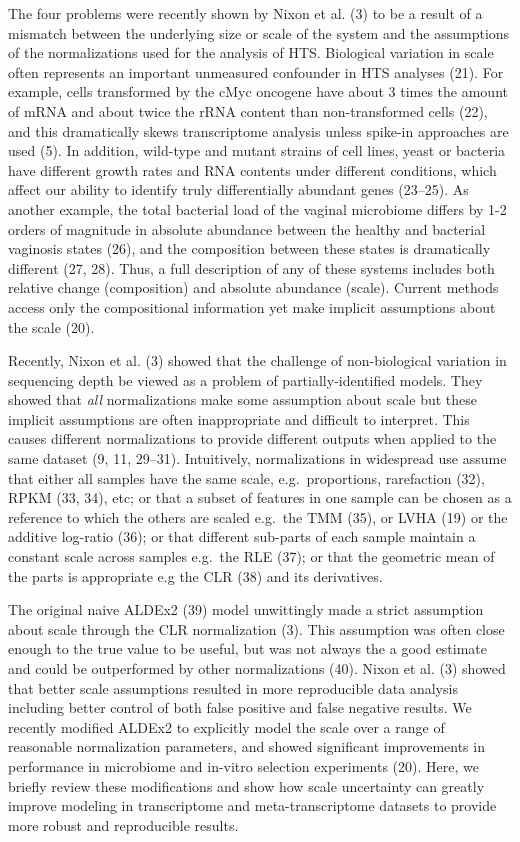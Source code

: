 \documentclass[
]{article}
\begin{document}
The four problems were recently shown by Nixon et al. (3) to be a result
of a mismatch between the underlying size or scale of the system and the
assumptions of the normalizations used for the analysis of HTS.
Biological variation in scale often represents an important unmeasured
confounder in HTS analyses (21). For example, cells transformed by the
cMyc oncogene have about 3 times the amount of mRNA and about twice the
rRNA content than non-transformed cells (22), and this dramatically
skews transcriptome analysis unless spike-in approaches are used (5). In
addition, wild-type and mutant strains of cell lines, yeast or bacteria
have different growth rates and RNA contents under different conditions,
which affect our ability to identify truly differentially abundant genes
(23--25). As another example, the total bacterial load of the vaginal
microbiome differs by 1-2 orders of magnitude in absolute abundance
between the healthy and bacterial vaginosis states (26), and the
composition between these states is dramatically different (27, 28).
Thus, a full description of any of these systems includes both relative
change (composition) and absolute abundance (scale). Current methods
access only the compositional information yet make implicit assumptions
about the scale (20).

Recently, Nixon et al. (3) showed that the challenge of non-biological
variation in sequencing depth be viewed as a problem of
partially-identified models. They showed that \emph{all} normalizations
make some assumption about scale but these implicit assumptions are
often inappropriate and difficult to interpret. This causes different
normalizations to provide different outputs when applied to the same
dataset (9, 11, 29--31). Intuitively, normalizations in widespread use
assume that either all samples have the same scale, e.g.~proportions,
rarefaction (32), RPKM (33, 34), etc; or that a subset of features in
one sample can be chosen as a reference to which the others are scaled
e.g.~the TMM (35), or LVHA (19) or the additive log-ratio (36); or that
different sub-parts of each sample maintain a constant scale across
samples e.g.~the RLE (37); or that the geometric mean of the parts is
appropriate e.g the CLR (38) and its derivatives.

The original naive ALDEx2 (39) model unwittingly made a strict
assumption about scale through the CLR normalization (3). This
assumption was often close enough to the true value to be useful, but
was not always the a good estimate and could be outperformed by other
normalizations (40). Nixon et al. (3) showed that better scale
assumptions resulted in more reproducible data analysis including better
control of both false positive and false negative results. We recently
modified ALDEx2 to explicitly model the scale over a range of reasonable
normalization parameters, and showed significant improvements in
performance in microbiome and in-vitro selection experiments (20). Here,
we briefly review these modifications and show how scale uncertainty can
greatly improve modeling in transcriptome and meta-transcriptome
datasets to provide more robust and reproducible results.
\end{document}
